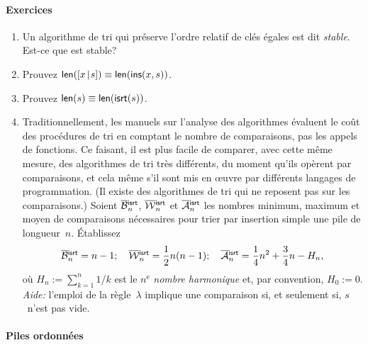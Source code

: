 \paragraph{Exercices}
\begin{enumerate}

  \item Un algorithme de tri qui préserve l'ordre relatif de clés
    égales est dit \emph{stable}. Est-ce que
     est stable?

  \item Prouvez \(\textsf{len}([{x}\!\mid\!{s}]) \equiv
    \textsf{len}(\textsf{ins}(x,s))\).

  \item Prouvez \(\textsf{len}(s) \equiv \textsf{len}(\textsf{isrt}(s))\).

  \item Traditionnellement, les manuels sur l'analyse des algorithmes
    évaluent le coût des procédures de tri en comptant le nombre de
    comparaisons, pas les appels de fonctions. Ce faisant, il est plus
    facile de comparer, avec cette même mesure, des algorithmes de tri
    très différents, du moment qu'ils opèrent par comparaisons, et
    cela même s'il sont mis en {\oe}uvre par différents langages de
    programmation. (Il existe des algorithmes de tri qui ne reposent
    pas sur les comparaisons.) Soient
    \(\OB{\fun{isrt}}{n}\),
    \(\OW{\fun{isrt}}{n}\) et
    \(\OM{\fun{isrt}}{n}\) les
    nombres minimum, maximum et moyen de comparaisons nécessaires pour
    trier par insertion simple une pile de longueur~\(n\). Établissez
    \begin{equation*}
      \OB{\fun{isrt}}{n} = n - 1; \quad
      \OW{\fun{isrt}}{n} = \frac{1}{2}n(n - 1); \quad
      \OM{\fun{isrt}}{n} = \frac{1}{4}n^2 + \frac{3}{4}n - H_n,
    \end{equation*}
    où \(H_n := \sum_{k=1}^n{1/k}\) est le \(n^\text{e}\) \emph{nombre
      harmonique} et, par convention,
    \(H_0 := 0\). \emph{Aide:} l'emploi de la règle~\(\lambda\)
    implique une comparaison si, et seulement si, \(s\)~n'est pas
    vide.
\end{enumerate}

\paragraph{Piles ordonnées}


